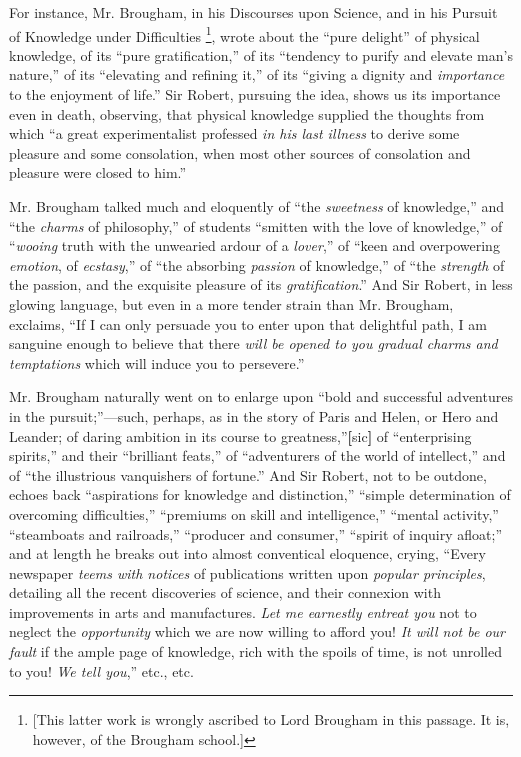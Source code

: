 For instance, Mr. Brougham, in his Discourses upon Science, and in
his Pursuit of Knowledge under Difficulties \footnote{[This latter work is wrongly ascribed to Lord Brougham in this
passage. It is, however, of the Brougham school.]},
wrote about the ``pure delight'' of physical knowledge, of its
``pure gratification,'' of its ``tendency to purify and
elevate man's nature,'' of its ``elevating and refining
it,'' of its ``giving a dignity and \emph{importance} to the
enjoyment of life.'' Sir Robert, pursuing the idea, shows us its
importance even in death, observing, that physical knowledge supplied
the thoughts from which ``a great experimentalist professed \emph{in
his last illness} to derive some pleasure and some consolation,
when most other sources of consolation and pleasure were closed to
him.''

Mr. Brougham talked much and eloquently of ``the \emph{sweetness}
of knowledge,'' and ``the \emph{charms} of philosophy,''
of students ``smitten with the love of knowledge,'' of ``\emph{wooing} truth with the unwearied ardour of a \emph{lover},''
of ``keen and overpowering \emph{emotion}, of \emph{ecstasy},''
of ``the absorbing \emph{passion} of knowledge,'' of ``the
\emph{strength} of the passion, and the exquisite pleasure of its \emph{gratification}.''
And Sir Robert, in less glowing language, but even in a more tender
strain than Mr. Brougham, exclaims, ``If I can only persuade you
to enter upon that delightful path, I am sanguine enough to believe
that there \emph{will be opened to you gradual charms and temptations}
which will induce you to persevere.''

Mr. Brougham naturally went on to enlarge upon ``bold and
successful adventures in the pursuit;''—such, perhaps, as in the
story of Paris and Helen, or Hero and Leander; of daring ambition in
its course to greatness,''\textbf{[}sic\textbf{]}
of ``enterprising spirits,''
and their ``brilliant feats,'' of ``adventurers of the
world of intellect,'' and of ``the illustrious vanquishers of
fortune.'' And Sir Robert, not to be outdone, echoes back
``aspirations for knowledge and distinction,'' ``simple
determination of overcoming difficulties,'' ``premiums on
skill and intelligence,'' ``mental activity,''
``steamboats and railroads,'' ``producer and
consumer,'' ``spirit of inquiry afloat;'' and at length he
breaks out into almost conventical eloquence, crying, ``Every newspaper \emph{teems with notices} of publications written upon \emph{popular
principles}, detailing all the recent discoveries of science, and
their connexion with improvements in arts and manufactures. \emph{Let me
earnestly entreat you} not to neglect the \emph{opportunity} which
we are now willing to afford you! \emph{It will not be our fault} if
the ample page of knowledge, rich with the spoils of time, is not
unrolled to you! \emph{We tell you},'' etc., etc.

